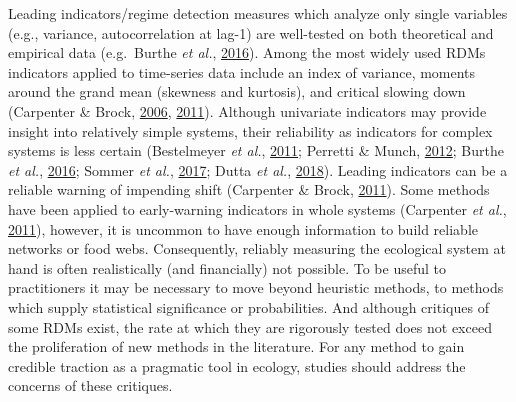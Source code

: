 \documentclass[12pt,twoside,openany]{reedthesis}
\begin{document}
Leading indicators/regime detection measures which analyze only single variables (e.g., variance, autocorrelation at lag-1) are well-tested on both theoretical and empirical data (e.g.~Burthe \emph{et al.}, \protect\hyperlink{ref-burthe2016early}{2016}). Among the most widely used RDMs indicators applied to time-series data include an index of variance, moments around the grand mean (skewness and kurtosis), and critical slowing down (Carpenter \& Brock, \protect\hyperlink{ref-carpenter2006rising}{2006}, \protect\hyperlink{ref-carpenterBrock2011early}{2011}). Although univariate indicators may provide insight into relatively simple systems, their reliability as indicators for complex systems is less certain (Bestelmeyer \emph{et al.}, \protect\hyperlink{ref-bestelmeyer_analysis_2011}{2011}; Perretti \& Munch, \protect\hyperlink{ref-perretti2012regime}{2012}; Burthe \emph{et al.}, \protect\hyperlink{ref-burthe2016early}{2016}; Sommer \emph{et al.}, \protect\hyperlink{ref-sommer2017generic}{2017}; Dutta \emph{et al.}, \protect\hyperlink{ref-dutta2018robustness}{2018}). Leading indicators can be a reliable warning of impending shift (Carpenter \& Brock, \protect\hyperlink{ref-carpenterBrock2011early}{2011}). Some methods have been applied to early-warning indicators in whole systems (Carpenter \emph{et al.}, \protect\hyperlink{ref-carpenter2011early}{2011}), however, it is uncommon to have enough information to build reliable networks or food webs. Consequently, reliably measuring the ecological system at hand is often realistically (and financially) not possible. To be useful to practitioners it may be necessary to move beyond heuristic methods, to methods which supply statistical significance or probabilities. And although critiques of some RDMs exist, the rate at which they are rigorously tested does not exceed the proliferation of new methods in the literature. For any method to gain credible traction as a pragmatic tool in ecology, studies should address the concerns of these critiques.
\end{document}
